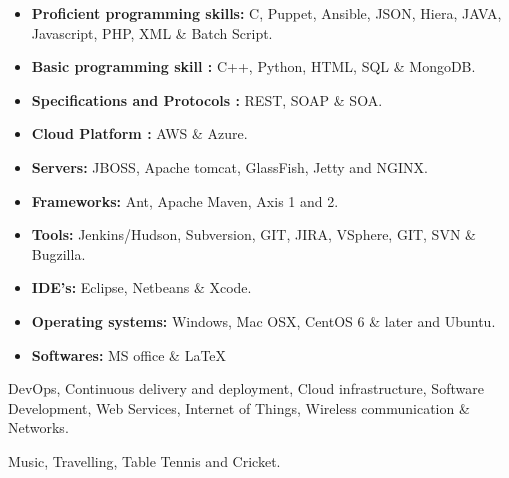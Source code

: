 \documentclass[11.9pt]{xetexCV}
\begin{document}
\begin{itemize}
\item \textbf{{\color{bluesubheading}Proficient programming skills:}}  \hspace{0.6cm}C, Puppet, Ansible, JSON, Hiera, JAVA, Javascript, PHP, XML 
\textbf{{\color{bluesubheading}}}  \hspace{5.8cm}\& Batch Script.
\item \textbf{{\color{bluesubheading}Basic programming skill :} } \hspace{1.2cm} C++, Python, HTML, SQL \& MongoDB.
\item \textbf{{\color{bluesubheading}Specifications and Protocols :} } \hspace{0.55 cm} REST, SOAP \& SOA.
\item \textbf{{\color{bluesubheading}Cloud Platform :} } \hspace{2.75 cm} AWS \& Azure.
\item \textbf{{\color{bluesubheading}Servers:} }\hspace{4.4cm} JBOSS, Apache tomcat, GlassFish, Jetty and NGINX.
\item \textbf{{\color{bluesubheading}Frameworks:} } \hspace{3.4cm}  Ant, Apache Maven, Axis 1 and 2.
\item \textbf{{\color{bluesubheading}Tools:} } \hspace{4.6cm} Jenkins/Hudson, Subversion, GIT, JIRA, VSphere, GIT, SVN
\textbf{{\color{bluesubheading}}}  \hspace{5.85cm}\& Bugzilla.
\item \textbf{{\color{bluesubheading}IDE's:}} \hspace{4.7cm} Eclipse, Netbeans \& Xcode.
\item \textbf{{\color{bluesubheading}Operating systems:} } \hspace{2.35cm} Windows, Mac OSX, CentOS 6 \& later and Ubuntu. 
\item \textbf{{\color{bluesubheading}Softwares:} }\hspace{4cm} MS office \&  \LaTeX
\end{itemize}

DevOps, Continuous delivery and deployment, Cloud infrastructure, Software Development, Web Services, Internet of Things, Wireless communication \& Networks.

Music, Travelling, Table Tennis and Cricket.
\end{document}
